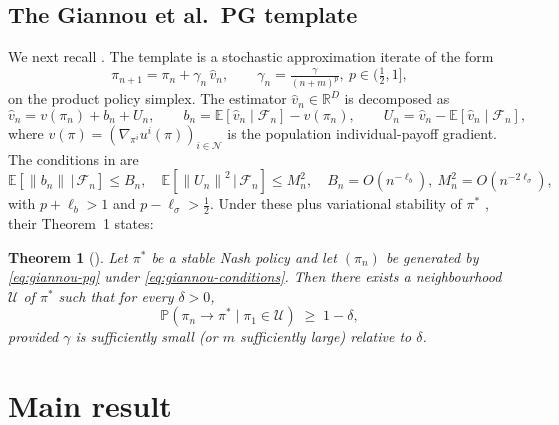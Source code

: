 \documentclass[11pt]{article}
\newtheorem{theorem}{Theorem}
\theoremstyle{definition}
\newcommand{\R}{\mathbb{R}}
\newcommand{\E}{\mathbb{E}}
\newcommand{\Prob}{\mathbb{P}}
\newcommand{\norm}[1]{\left\lVert #1 \right\rVert}
\newcommand{\calF}{\mathcal{F}}
\newcommand{\calN}{\mathcal{N}}
\newcommand{\calU}{\mathcal{U}}
\begin{document}
\subsection{The Giannou et al.\ PG template}

We next recall \cite[§2--3]{Giannou2022}. The template is a stochastic approximation iterate of the form
\begin{equation}\label{eq:giannou-pg}
\pi_{n+1}=\pi_n+\gamma_n\,\hat v_n,\qquad
\gamma_n=\tfrac{\gamma}{(n+m)^p},\ p\in(\tfrac12,1],
\end{equation}
on the product policy simplex. The estimator $\hat v_n\in\R^D$ is decomposed as
\begin{equation}\label{eq:bias-variance-decomp}
\hat v_n = v(\pi_n) + b_n + U_n,
\qquad
b_n=\E[\hat v_n\mid\calF_n]-v(\pi_n),
\qquad
U_n=\hat v_n-\E[\hat v_n\mid\calF_n],
\end{equation}
where $v(\pi)=(\nabla_{\pi^i}u^i(\pi))_{i\in\calN}$ is the population individual-payoff gradient. The conditions in \cite[Eq.~(2.10)]{Giannou2022} are
\begin{equation}\label{eq:giannou-conditions}
\E\!\left[\norm{b_n}\,\big|\,\calF_n\right]\le B_n,\quad
\E\!\left[\norm{U_n}^2\,\big|\,\calF_n\right]\le M_n^2,\quad
B_n=O(n^{-\ell_b}),\ M_n^2=O(n^{-2\ell_\sigma}),
\end{equation}
with $p+\ell_b>1$ and $p-\ell_\sigma>\tfrac12$. Under these plus variational stability of $\pi^*$ \cite[Def.~2]{Giannou2022}, their Theorem~1 states:

\begin{theorem}[{\cite[Theorem~1]{Giannou2022}}]\label{thm:giannou}
Let $\pi^*$ be a stable Nash policy and let $(\pi_n)$ be generated by \eqref{eq:giannou-pg} under \eqref{eq:giannou-conditions}. Then there exists a neighbourhood $\calU$ of $\pi^*$ such that for every $\delta>0$,
\begin{equation}\label{eq:giannou-conclusion}
\Prob\!\left(\pi_n\to\pi^*\;\big|\;\pi_1\in\calU\right)\;\ge\;1-\delta,
\end{equation}
provided $\gamma$ is sufficiently small (or $m$ sufficiently large) relative to $\delta$.
\end{theorem}

\section{Main result}\label{sec:main}
\end{document}
